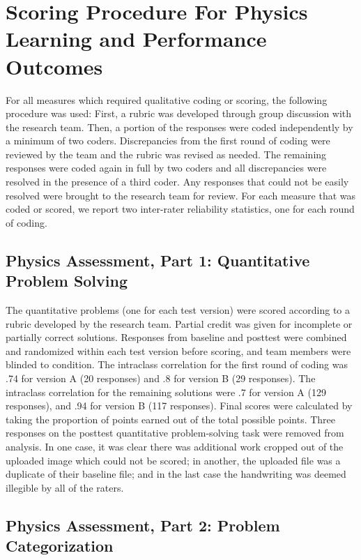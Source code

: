 \documentclass[
  letterpaper,
  DIV=11,
  numbers=noendperiod]{scrreprt}
\begin{document}
\chapter{Scoring Procedure For Physics Learning and Performance
Outcomes}\label{scoring-procedure-for-physics-learning-and-performance-outcomes}

For all measures which required qualitative coding or scoring, the
following procedure was used: First, a rubric was developed through
group discussion with the research team. Then, a portion of the
responses were coded independently by a minimum of two coders.
Discrepancies from the first round of coding were reviewed by the team
and the rubric was revised as needed. The remaining responses were coded
again in full by two coders and all discrepancies were resolved in the
presence of a third coder. Any responses that could not be easily
resolved were brought to the research team for review. For each measure
that was coded or scored, we report two inter-rater reliability
statistics, one for each round of coding.

\section{Physics Assessment, Part 1: Quantitative Problem
Solving}\label{physics-assessment-part-1-quantitative-problem-solving}

The quantitative problems (one for each test version) were scored
according to a rubric developed by the research team. Partial credit was
given for incomplete or partially correct solutions. Responses from
baseline and posttest were combined and randomized within each test
version before scoring, and team members were blinded to condition. The
intraclass correlation for the first round of coding was .74 for version
A (20 responses) and .8 for version B (29 responses). The intraclass
correlation for the remaining solutions were .7 for version A (129
responses), and .94 for version B (117 responses). Final scores were
calculated by taking the proportion of points earned out of the total
possible points. Three responses on the posttest quantitative
problem-solving task were removed from analysis. In one case, it was
clear there was additional work cropped out of the uploaded image which
could not be scored; in another, the uploaded file was a duplicate of
their baseline file; and in the last case the handwriting was deemed
illegible by all of the raters.

\section{Physics Assessment, Part 2: Problem
Categorization}\label{physics-assessment-part-2-problem-categorization}
\end{document}
